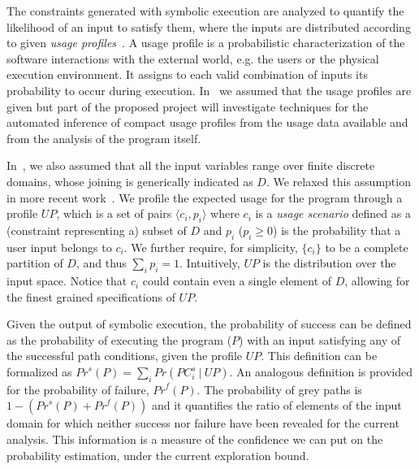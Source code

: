 The constraints generated with symbolic execution are analyzed to
quantify the likelihood of an input to satisfy them, where the inputs
are distributed according to given {\em usage
profiles}~\cite{filieri-etal-icse2013}. A usage profile is a probabilistic
characterization of the software interactions with the external world,
e.g. the users or the physical execution environment.  It assigns to
each valid combination of inputs its probability to occur during
 execution. 
In~\cite{filieri-etal-icse2013} we assumed that the usage profiles
are given but part of the proposed project will investigate techniques for the 
automated inference of compact usage profiles from the usage data 
available and from the analysis of the program itself.

In~\cite{filieri-etal-icse2013}, we also assumed that all the input variables
range over finite discrete domains, whose joining is generically
indicated as $D$. We relaxed this assumption in more recent work~\cite{Borges2014PLDI}. We profile the expected usage for the program through a profile
$\textit{UP}$, which is a set of pairs $\langle
c_i, p_i \rangle$ where $c_i$ is a \emph{usage scenario} defined as a
(constraint representing a) subset of $D$ and $p_i$ ($p_i\geq 0$) is
the probability that a user input belongs to $c_i$. We further
require, for simplicity, $\{c_i\}$ to be a complete partition of $D$,
and thus $\sum_i p_i=1$. Intuitively, $UP$ is the distribution over
the input space. Notice that $c_i$ could contain even a single element
of $D$, allowing for the finest grained specifications of
$\textit{UP}$.

Given the output of symbolic execution, the probability of success can
be defined as the probability of executing the program ($P$) with
an input satisfying any of the successful path conditions, given the
profile $UP$. This definition can be formalized as
$\textit{Pr}^s(P)=\sum_{i} \textit{Pr}(\textit{PC}_i^s \ | \ \textit{UP})$.
An analogous definition is provided for the probability of failure,
$\textit{Pr}^f(P)$. The probability of grey paths is $1-(\textit{Pr}^s(P)+\textit{Pr}^f(P))$ and it
quantifies the ratio of elements
of the input domain for which neither success nor failure have been
revealed for the current analysis. This information is a measure of
the confidence we can put on the probability estimation, under
the current exploration bound.

